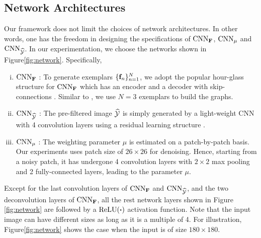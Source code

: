 \documentclass[10pt,twocolumn,letterpaper]{article}
\begin{document}
\subsection{Network Architectures}

Our framework does not limit the choices of network architectures. 
In other words, one has the freedom in designing the specifications of ${\rm CNN}_{\bf F}$, ${\rm CNN}_{\mu}$ and ${\rm CNN}_{\widehat{\cal Y}}$. 
In our experimentation, we choose the networks shown in Figure\;\ref{fig:network}.
Specifically, 
\begin{enumerate}[(i)]
\item{${\rm CNN}_{\bf F}$} : 
To generate exemplars $\{{\bf f}_n\}_{n=1}^N$, we adopt the popular hour-glass structure for ${\rm CNN}_{\bf F}$ which has an encoder and a decoder with skip-connections \cite{ronneberger2015u}. 
Similar to \cite{pang2017graph}, we use $N=3$ exemplars to build the graphs.
\item{${\rm CNN}_{\widehat{\cal Y}}$} : The pre-filtered image $\widehat{\cal Y}$ is simply generated by a light-weight CNN with 4 convolution layers using a residual learning structure \cite{he16}.
\item{${\rm CNN}_{\mu}$} : The weighting parameter $\mu$ is estimated on a patch-by-patch basis. Our experiments uses patch size of $26 \times 26$ for denoising. Hence, starting from a noisy patch, it has undergone 4 convolution layers with $2\times 2$ max pooling and 2 fully-connected layers, leading to the parameter $\mu$.
\end{enumerate}
Except for the last convolution layers of ${\rm CNN}_{\bf F}$ and ${\rm CNN}_{\widehat{\cal Y}}$, and the two deconvolution layers of ${\rm CNN}_{\bf F}$, all the rest network layers shown in Figure\,\ref{fig:network} are followed by a ${\rm ReLU}(\bm\cdot)$ activation function. 
Note that the input image can have different sizes as long as it is a multiple of 4. 
For illustration, Figure\;\ref{fig:network} shows the case when the input is of size $180\times 180$.
\end{document}
